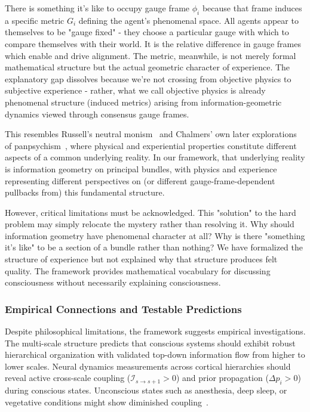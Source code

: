 \documentclass[11pt]{article}
\begin{document}
There is something it's like to occupy gauge frame $\phi_i$ because that frame induces a specific metric $G_i$ defining the agent's phenomenal space. All agents appear to themselves to be "gauge fixed" - they choose a particular gauge with which to compare themselves with their world.  It is the relative difference in gauge frames which enable and drive alignment. The metric, meanwhile, is not merely formal mathematical structure but the actual geometric character of experience. The explanatory gap dissolves because we're not crossing from objective physics to subjective experience - rather, what we call objective physics is already phenomenal structure (induced metrics) arising from information-geometric dynamics viewed through consensus gauge frames.

This resembles Russell's neutral monism~\cite{Russell1927} and Chalmers' own later explorations of panpsychism~\cite{Chalmers2013consciousness}, where physical and experiential properties constitute different aspects of a common underlying reality. In our framework, that underlying reality is information geometry on principal bundles, with physics and experience representing different perspectives on (or different gauge-frame-dependent pullbacks from) this fundamental structure.

However, critical limitations must be acknowledged. This "solution" to the hard problem may simply relocate the mystery rather than resolving it. Why should information geometry have phenomenal character at all? Why is there "something it's like" to be a section of a bundle rather than nothing? We have formalized the structure of experience but not explained why that structure produces felt quality. The framework provides mathematical vocabulary for discussing consciousness without necessarily explaining consciousness.

\subsubsection{Empirical Connections and Testable Predictions}

Despite philosophical limitations, the framework suggests empirical investigations. The multi-scale structure predicts that conscious systems should exhibit robust hierarchical organization with validated top-down information flow from higher to lower scales. Neural dynamics measurements across cortical hierarchies should reveal active cross-scale coupling ($\mathcal{I}_{s \to s+1} > 0$) and prior propagation ($\Delta p_i > 0$) during conscious states. Unconscious states such as anesthesia, deep sleep, or vegetative conditions might show diminished coupling~\cite{Mashour2020,Luppi2021}.
\end{document}
